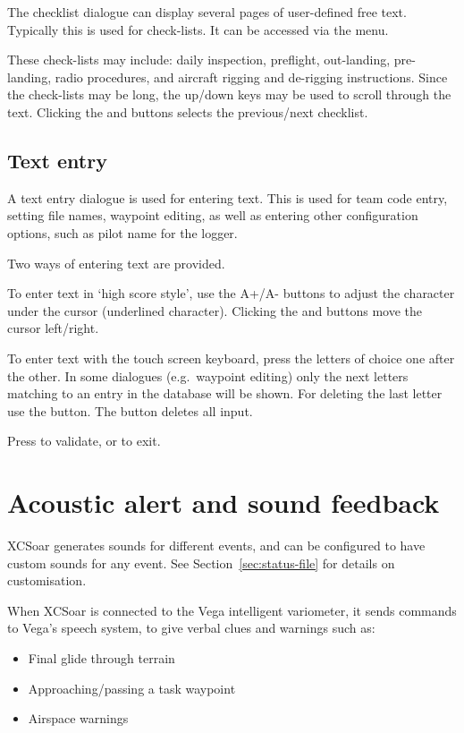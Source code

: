 The checklist dialogue can display several pages of user-defined free text.
Typically this is used for check-lists. It can be accessed via the menu.

\blink{}

These check-lists may include: daily inspection, preflight,
out-landing, pre-landing, radio procedures, and aircraft rigging and
de-rigging instructions.  Since the check-lists may be long, the
up/down keys may be used to scroll through the text. Clicking the
\bmenuw{$<$} and \bmenuw{$>$} buttons selects the previous/next
checklist.


\subsection*{Text entry} \label{sec:textentry}

A text entry dialogue is used for entering text.  This is used for team
code entry, setting file names, waypoint editing, as well as entering
other configuration options, such as pilot name for the logger.

Two ways of entering text are provided. 

To enter text in `high score style', use the A+/A- buttons to adjust the 
character under the cursor (underlined character). Clicking the \button{$<$} 
and \button{$>$} buttons move the cursor left/right.  

To enter text with the touch screen keyboard, press the letters of choice 
one after the other. In some dialogues (e.g.\ waypoint editing) only the next
letters matching to an entry in the database will be shown. For deleting the 
last letter use the \button{$<-$} button. The  button deletes all input.

Press  to validate, or  to exit.


\section{Acoustic alert and sound feedback}

XCSoar generates sounds for different events, and can be configured to
have custom sounds for any event.  See Section~\ref{sec:status-file} for
details on customisation.

When XCSoar is connected to the Vega intelligent variometer, it sends
commands to Vega's speech system, to give verbal clues and warnings such as:
\begin{itemize}
\item Final glide through terrain
\item Approaching/passing a task waypoint
\item Airspace warnings
\end{itemize}

